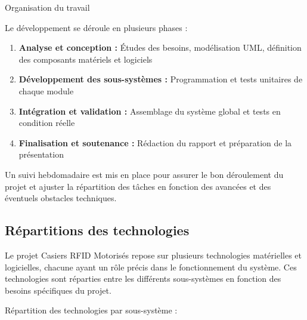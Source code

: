 \documentclass[main.tex]{subfiles}
\begin{document}
Organisation du travail

Le développement se déroule en plusieurs phases :

\begin{enumerate}

	\item \textbf{Analyse et conception :} Études des besoins, modélisation UML, définition des composants matériels et logiciels
	\item \textbf{Développement des sous-systèmes :} Programmation et tests unitaires de chaque module
	\item \textbf{Intégration et validation :} Assemblage du système global et tests en condition réelle
	\item \textbf{Finalisation et soutenance :} Rédaction du rapport et préparation de la présentation

\end{enumerate}

Un suivi hebdomadaire est mis en place pour assurer le bon déroulement du projet et ajuster la répartition des tâches en fonction des avancées et des éventuels obstacles techniques.



\subsection{Répartitions des technologies}

\quad Le projet Casiers RFID Motorisés repose sur plusieurs technologies matérielles et logicielles, chacune ayant un rôle précis dans le fonctionnement du système. Ces technologies sont réparties entre les différents sous-systèmes en fonction des besoins spécifiques du projet.

Répartition des technologies par sous-système :

\renewcommand{\arraystretch}{1.5}
\setlength{\tabcolsep}{6pt}
\end{document}
